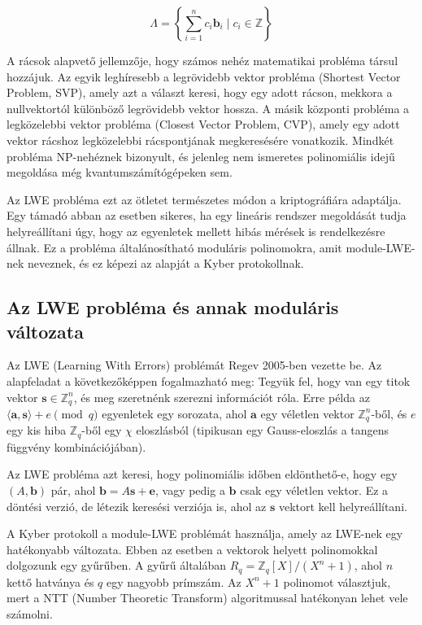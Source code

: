 $$\Lambda = \left\{ \sum_{i=1}^{n} c_i \mathbf{b}_i \mid c_i \in \mathbb{Z} \right\}$$

A rácsok alapvető jellemzője, hogy számos nehéz matematikai probléma társul hozzájuk. Az egyik leghíresebb 
a legrövidebb vektor probléma (Shortest Vector Problem, SVP), amely azt a választ keresi, hogy egy adott rácson, 
mekkora a nullvektortól különböző legrövidebb vektor hossza. A másik központi probléma a legközelebbi vektor 
probléma (Closest Vector Problem, CVP), amely egy adott vektor rácshoz legközelebbi rácspontjának 
megkeresésére vonatkozik. Mindkét probléma NP-nehéznek bizonyult, és jelenleg nem ismeretes polinomiális 
idejű megoldása még kvantumszámítógépeken sem.

Az LWE probléma ezt az ötletet természetes módon a kriptográfiára adaptálja. Egy támadó abban az esetben 
sikeres, ha egy lineáris rendszer megoldását tudja helyreállítani úgy, hogy az egyenletek mellett hibás 
mérések is rendelkezésre állnak. Ez a probléma általánosítható moduláris polinomokra, amit 
module-LWE-nek neveznek, és ez képezi az alapját a Kyber protokollnak.

\subsection{Az LWE probléma és annak moduláris változata}

Az LWE (Learning With Errors) problémát Regev 2005-ben vezette be. Az alapfeladat a következőképpen 
fogalmazható meg: Tegyük fel, hogy van egy titok vektor $\mathbf{s} \in \mathbb{Z}_q^n$, és meg szeretnénk 
szerezni információt róla. Erre példa az $\langle \mathbf{a}, \mathbf{s} \rangle + e \pmod{q}$ egyenletek 
egy sorozata, ahol $\mathbf{a}$ egy véletlen vektor $\mathbb{Z}_q^n$-ből, és $e$ egy kis hiba 
$\mathbb{Z}_q$-ből egy $\chi$ eloszlásból (tipikusan egy Gauss-eloszlás a tangens függvény kombinációjában).

Az LWE probléma azt keresi, hogy polinomiális időben eldönthető-e, hogy egy $(A, \mathbf{b})$ pár, ahol 
$\mathbf{b} = A\mathbf{s} + \mathbf{e}$, vagy pedig a $\mathbf{b}$ csak egy véletlen vektor. Ez a 
döntési verzió, de létezik keresési verziója is, ahol az $\mathbf{s}$ vektort kell helyreállítani.

A Kyber protokoll a module-LWE problémát használja, amely az LWE-nek egy hatékonyabb változata. 
Ebben az esetben a vektorok helyett polinomokkal dolgozunk egy gyűrűben. A gyűrű általában 
$R_q = \mathbb{Z}_q[X]/(X^n+1)$, ahol $n$ kettő hatványa és $q$ egy nagyobb prímszám. 
Az $X^n+1$ polinomot választjuk, mert a NTT (Number Theoretic Transform) algoritmussal 
hatékonyan lehet vele számolni.

